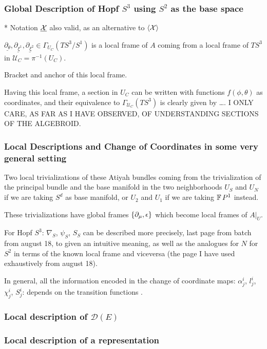 \subsubsection{Global Description of Hopf $S^3$ using $S^2$ as the base space}

* Notation $\underline{\mathcal{X}}$ also valid, as an alternative to $\left\langle \mathcal{X} \right\rangle$

$\underline{\partial_\theta}, \underline{\partial_{\xi^1}}, \underline{\partial_{\xi^2}} \in \Gamma_{U_C} (TS^3/S^1)$ is a local frame of $A$ coming from a local frame of $TS^3$ in $\mathcal U_C = \pi^{-1}(U_C)$.

Bracket and anchor of this local frame.

Having this local frame, a section in $U_C$ can be written with functions $f(\phi, \theta)$ as coordinates, and their equivalence to $\Gamma_{\mathcal U_C}(TS^3)$ is clearly given by \dots. I ONLY CARE, AS FAR AS I HAVE OBSERVED, OF UNDERSTANDING SECTIONS OF THE ALGEBROID.

\subsubsection{Local Descriptions and Change of Coordinates in some very general setting}

Two local trivializations of these Atiyah bundles coming from the trivialization of the principal bundle and the base manifold in the two neighborhoods $U_S$ and $U_N$ if we are taking $S^d$ as base manifold, or $U_2$ and $U_1$ if we are taking $\operatorname{\mathbb{F}} P^1$ instead.

These trivializations have global frames $\set{\partial_\mu, \epsilon}$ which become local frames of $A|_U$.

For Hopf $S^3$: $\nabla_S$, $\psi_S$, $S_S$ can be described more precisely, last page from batch from august 18, to given an intuitive meaning, as well as the analogues for $N$ for $S^2$ in terms of the known local frame and viceversa (the page I have used exhaustively from august 18). 

In general, all the information encoded in the change of coordinate maps: $\alpha^i_j$, $l^i_j$, $\chi^i_j$, $S^i_j$: depends on the transition functions .



\subsubsection{Local description of $\mathcal D(E)$}

\subsubsection{Local description of a representation}